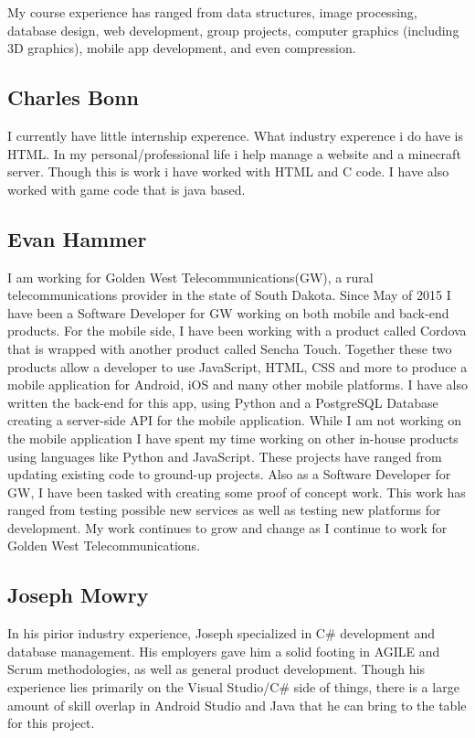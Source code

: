 My course experience has ranged from data structures, image processing, database design, web development, group projects, computer graphics (including 3D graphics), mobile app development, and even compression.

\subsection{Charles Bonn}

I currently have little internship experence. What industry experence i do have is HTML. In my personal/professional life i help manage a website and a minecraft server. Though this is work i have worked with HTML and C code. I have also worked with game code that is java based.

\subsection{Evan Hammer}

I am working for Golden West Telecommunications(GW), a rural telecommunications provider in the state of South Dakota.  Since May of 2015 I have been a Software Developer for GW working on both mobile and back-end products.  For the mobile side, I have been working with a product called Cordova that is wrapped with another product called Sencha Touch.  Together these two products allow a developer to use JavaScript, HTML, CSS and more to produce a mobile application for Android, iOS and many other mobile platforms.  I have also written the back-end for this app, using Python and a PostgreSQL Database creating a server-side API for the mobile application.  While I am not working on the mobile application I have spent my time working on other in-house products using languages like Python and JavaScript.  These projects have ranged from updating existing code to ground-up projects.  Also as a Software Developer for GW, I have been tasked with creating some proof of concept work.  This work has ranged from testing possible new services as well as testing new platforms for development.  My work continues to grow and change as I continue to work for Golden West Telecommunications.

\subsection{Joseph Mowry}

In his pirior industry experience, Joseph specialized in C\# development and database management. His employers gave him a solid footing in AGILE and Scrum methodologies, as well as general product development. Though his experience lies primarily on the Visual Studio/C\# side of things, there is a large amount of skill overlap in Android Studio and Java that he can bring to the table for this project.



